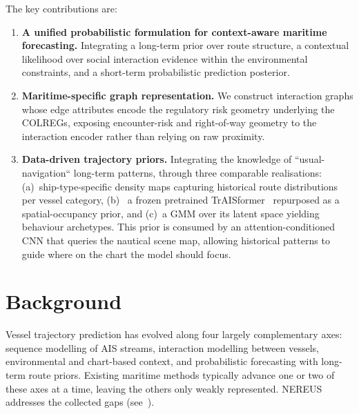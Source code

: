 \documentclass[runningheads]{preamp/llncs}
\begin{document}
The key contributions are:
%
\begin{enumerate}
    \item \textbf{A unified probabilistic formulation
    for context-aware maritime forecasting.}
    Integrating
    a long-term prior over route structure,
    a contextual likelihood over social interaction evidence
    within the environmental constraints,
    and
    a short-term probabilistic prediction posterior.

    \item \textbf{Maritime-specific graph representation.}
    We construct interaction graphs whose edge attributes encode
    the regulatory risk geometry underlying the \ac{COLREGs},
    exposing encounter-risk and right-of-way geometry
    to the interaction encoder
    rather than relying on raw proximity.

    \item \textbf{Data-driven trajectory priors.}
    Integrating the knowledge of ``usual-navigation`` long-term patterns,
    through three comparable realisations:
    (a)~ship-type-specific density maps capturing historical route distributions per vessel category,
    (b)~ a frozen pretrained TrAISformer~\cite{nguyen2024transformer} repurposed as a spatial-occupancy prior,
    and
    (c)~a \ac{GMM} over its latent space yielding behaviour archetypes.
    This prior is consumed by an attention-conditioned \ac{CNN}
    that queries the nautical scene map,
    allowing historical patterns to guide where on the chart the model should focus.
\end{enumerate}


\section{Background}
\label{sec:background}

Vessel trajectory prediction
has evolved along four largely complementary axes:
sequence modelling of \ac{AIS} streams,
interaction modelling between vessels,
environmental and chart-based context,
and
probabilistic forecasting with long-term route priors.
%
Existing maritime methods typically advance one or two of these axes at a time,
leaving the others only weakly represented.
\ac{NEREUS} addresses the collected gaps (see~).
\end{document}
